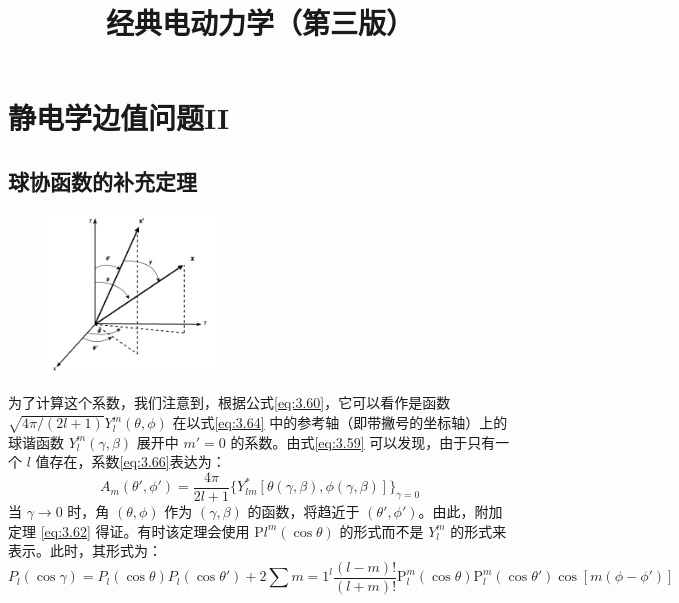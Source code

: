 \documentclass[lang=cn,10pt,newtx,bibend=biber,device=pad]{elegantbook}
\title{经典电动力学（第三版）}
\begin{document}
	
\maketitle
\frontmatter

\tableofcontents

\mainmatter

\chapter{静电学边值问题II}
\section{球协函数的补充定理}
\begin{figure}[h]
    \centering
    \includegraphics[width=0.4\textwidth]{figure/SphericalAdd.png}
    \caption{}
    \label{fig:fig1}
\end{figure}
为了计算这个系数，我们注意到，根据公式\ref{eq:3.60}，它可以看作是函数 $\sqrt{4\pi/(2l + 1)} Y_l^m(\theta, \phi)$ 在以式\ref{eq:3.64} 中的参考轴（即带撇号的坐标轴）上的球谐函数 $Y_l^m(\gamma, \beta)$ 展开中 $m{\prime} = 0$ 的系数。由式\ref{eq:3.59} 可以发现，由于只有一个 $l$ 值存在，系数\ref{eq:3.66}表达为：
\begin{equation}\label{eq:3.67}
    A_m(\theta',\phi')=\frac{4\pi}{2l+1}\{Y_{lm}^{*}[\theta(\gamma,\beta),\phi(\gamma,\beta)]\}_{\gamma=0}
\end{equation}
当 $\gamma \to 0$ 时，角 $(\theta, \phi)$ 作为 $(\gamma, \beta)$ 的函数，将趋近于 $(\theta{\prime}, \phi{\prime})$。由此，附加定理 \ref{eq:3.62} 得证。有时该定理会使用 $\mathrm{P}l^m(\cos \theta)$ 的形式而不是 $Y_l^m$ 的形式来表示。此时，其形式为：
\begin{equation}\label{eq:3.68}
P_l(\cos \gamma) = P_l(\cos \theta) P_l(\cos \theta{\prime}) + 2 \sum{m=1}^l \frac{(l - m)!}{(l + m)!} \mathrm{P}_l^m(\cos \theta) \mathrm{P}_l^m(\cos \theta{\prime}) \cos[m(\phi - \phi{\prime})] \tag{3.68}
\end{equation}
\end{document}
